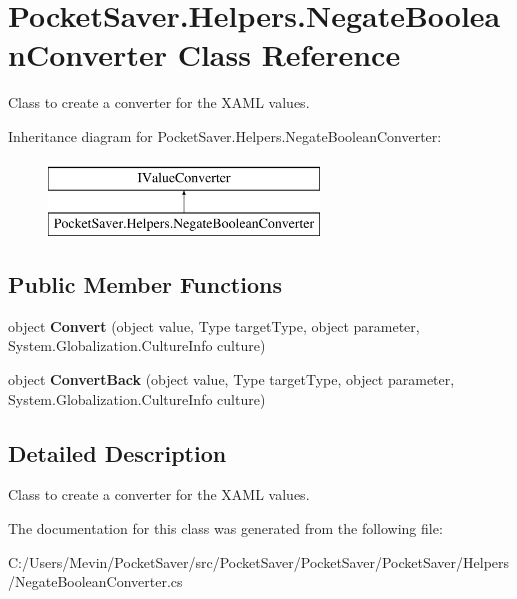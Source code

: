 \hypertarget{class_pocket_saver_1_1_helpers_1_1_negate_boolean_converter}{}\section{Pocket\+Saver.\+Helpers.\+Negate\+Boolean\+Converter Class Reference}
\label{class_pocket_saver_1_1_helpers_1_1_negate_boolean_converter}


Class to create a converter for the X\+A\+ML values.  


Inheritance diagram for Pocket\+Saver.\+Helpers.\+Negate\+Boolean\+Converter\+:\begin{figure}[H]
\begin{center}
\leavevmode
\includegraphics[height=2.000000cm]{class_pocket_saver_1_1_helpers_1_1_negate_boolean_converter}
\end{center}
\end{figure}
\subsection*{Public Member Functions}
\begin{DoxyCompactItemize}
\item 
\mbox{\label{class_pocket_saver_1_1_helpers_1_1_negate_boolean_converter_a210dbb511fcb526fb0ebbea3f5f95e44}} 
object {\bfseries Convert} (object value, Type target\+Type, object parameter, System.\+Globalization.\+Culture\+Info culture)
\item 
\mbox{\label{class_pocket_saver_1_1_helpers_1_1_negate_boolean_converter_a2e798fe3f3ac99af7e00e7b3a8f52cd7}} 
object {\bfseries Convert\+Back} (object value, Type target\+Type, object parameter, System.\+Globalization.\+Culture\+Info culture)
\end{DoxyCompactItemize}


\subsection{Detailed Description}
Class to create a converter for the X\+A\+ML values. 



The documentation for this class was generated from the following file\+:\begin{DoxyCompactItemize}
\item 
C\+:/\+Users/\+Mevin/\+Pocket\+Saver/src/\+Pocket\+Saver/\+Pocket\+Saver/\+Pocket\+Saver/\+Helpers/Negate\+Boolean\+Converter.\+cs\end{DoxyCompactItemize}
